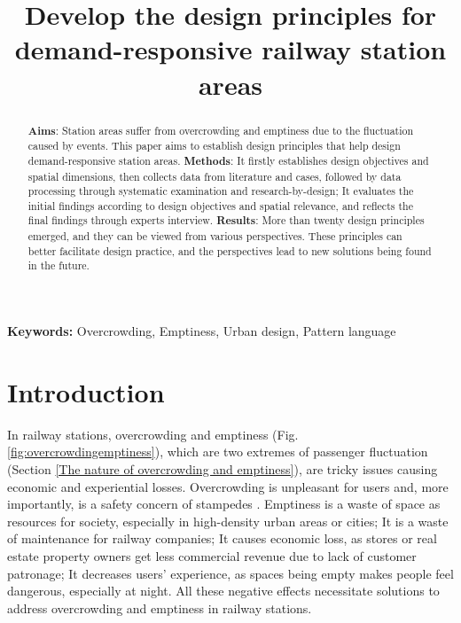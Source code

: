 \documentclass[]{article}
\begin{document}
\sloppy

\title{Develop the design principles for demand-responsive railway station areas}
\author{}
\date{}

\maketitle

\begin{abstract}
\textbf{Aims}: Station areas suffer from overcrowding and emptiness due to the fluctuation caused by events. This paper aims to establish design principles that help design demand-responsive station areas. \textbf{Methods}: It firstly establishes design objectives and spatial dimensions, then collects data from literature and cases, followed by data processing through systematic examination and research-by-design; It evaluates the initial findings according to design objectives and spatial relevance, and reflects the final findings through experts interview. \textbf{Results}: More than twenty design principles emerged, and they can be viewed from various perspectives. These principles can better facilitate design practice, and the perspectives lead to new solutions being found in the future.
\end{abstract}


\providecommand{\keywords}[1]{\textbf{Keywords:} #1}
\keywords{Overcrowding, Emptiness, Urban design, Pattern language}


\section{Introduction}
\label{Introduction}
In railway stations, overcrowding and emptiness (Fig. \ref{fig:overcrowdingemptiness}), which are two extremes of passenger fluctuation (Section \ref{The nature of overcrowding and emptiness}), are tricky issues causing economic and experiential losses. Overcrowding is unpleasant for users and, more importantly, is a safety concern of stampedes \citep{chinadailyStampedeKillsOne2008, almeidaHumanStampedesUpdated2019}. Emptiness is a waste of space as resources for society, especially in high-density urban areas or cities; It is a waste of maintenance for railway companies; It causes economic loss, as stores or real estate property owners get less commercial revenue due to lack of customer patronage; It decreases users' experience, as spaces being empty makes people feel dangerous, especially at night. All these negative effects necessitate solutions to address overcrowding and emptiness in railway stations.
\end{document}
